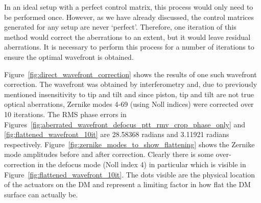 In an ideal setup with a perfect control matrix, this process would only need to be performed once. However, as we have already discussed, the control matrices generated for any setup are never `perfect'. Therefore, one iteration of this method would correct the aberrations to an extent, but it would leave residual aberrations. It is necessary to perform this process for a number of iterations to ensure the optimal wavefront is obtained. 

Figure~\ref{fig:direct_wavefront_correction} shows the results of one such wavefront correction. The wavefront was obtained by interferometry and, due to previously mentioned insensitivity to tip and tilt and since piston, tip and tilt are not true optical aberrations, Zernike modes 4-69 (using Noll indices) were corrected over 10 iterations. The RMS phase errors in Figures~\ref{fig:aberrated_wavefront_defocus_ptt_rmv_crop_phase_only} and \ref{fig:flattened_wavefront_10it} are 28.58368 radians and 3.11921 radians respectively. Figure~\ref{fig:zernike_modes_to_show_flattening} shows the Zernike mode amplitudes before and after correction. Clearly there is some over-correction in the defocus mode (Noll index 4) in particular which is visible in Figure~\ref{fig:flattened_wavefront_10it}. The dots visible are the physical location of the actuators on the DM and represent a limiting factor in how flat the DM surface can actually be. 

